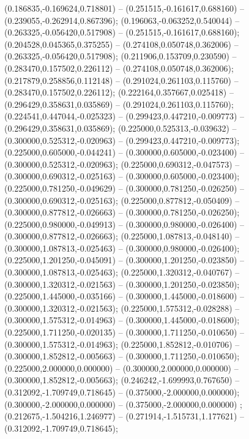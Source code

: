  (0.186835,-0.169624,0.718801) -- (0.251515,-0.161617,0.688160) -- (0.239055,-0.262914,0.867396);
 (0.196063,-0.063252,0.540044) -- (0.263325,-0.056420,0.517908) -- (0.251515,-0.161617,0.688160);
 (0.204528,0.045365,0.375255) -- (0.274108,0.050748,0.362006) -- (0.263325,-0.056420,0.517908);
 (0.211906,0.153709,0.230590) -- (0.283470,0.157502,0.226112) -- (0.274108,0.050748,0.362006);
 (0.217879,0.258856,0.112148) -- (0.291024,0.261103,0.115760) -- (0.283470,0.157502,0.226112);
 (0.222164,0.357667,0.025418) -- (0.296429,0.358631,0.035869) -- (0.291024,0.261103,0.115760);
 (0.224541,0.447044,-0.025323) -- (0.299423,0.447210,-0.009773) -- (0.296429,0.358631,0.035869);
 (0.225000,0.525313,-0.039632) -- (0.300000,0.525312,-0.020963) -- (0.299423,0.447210,-0.009773);
 (0.225000,0.605000,-0.044241) -- (0.300000,0.605000,-0.023400) -- (0.300000,0.525312,-0.020963);
 (0.225000,0.690312,-0.047573) -- (0.300000,0.690312,-0.025163) -- (0.300000,0.605000,-0.023400);
 (0.225000,0.781250,-0.049629) -- (0.300000,0.781250,-0.026250) -- (0.300000,0.690312,-0.025163);
 (0.225000,0.877812,-0.050409) -- (0.300000,0.877812,-0.026663) -- (0.300000,0.781250,-0.026250);
 (0.225000,0.980000,-0.049913) -- (0.300000,0.980000,-0.026400) -- (0.300000,0.877812,-0.026663);
 (0.225000,1.087813,-0.048140) -- (0.300000,1.087813,-0.025463) -- (0.300000,0.980000,-0.026400);
 (0.225000,1.201250,-0.045091) -- (0.300000,1.201250,-0.023850) -- (0.300000,1.087813,-0.025463);
 (0.225000,1.320312,-0.040767) -- (0.300000,1.320312,-0.021563) -- (0.300000,1.201250,-0.023850);
 (0.225000,1.445000,-0.035166) -- (0.300000,1.445000,-0.018600) -- (0.300000,1.320312,-0.021563);
 (0.225000,1.575312,-0.028288) -- (0.300000,1.575312,-0.014963) -- (0.300000,1.445000,-0.018600);
 (0.225000,1.711250,-0.020135) -- (0.300000,1.711250,-0.010650) -- (0.300000,1.575312,-0.014963);
 (0.225000,1.852812,-0.010706) -- (0.300000,1.852812,-0.005663) -- (0.300000,1.711250,-0.010650);
 (0.225000,2.000000,0.000000) -- (0.300000,2.000000,0.000000) -- (0.300000,1.852812,-0.005663);
 (0.246242,-1.699993,0.767650) -- (0.312092,-1.709749,0.718645) -- (0.375000,-2.000000,0.000000);
 (0.300000,-2.000000,0.000000) -- (0.375000,-2.000000,0.000000) ;
 (0.212675,-1.504216,1.246977) -- (0.271914,-1.515731,1.177621) -- (0.312092,-1.709749,0.718645);
